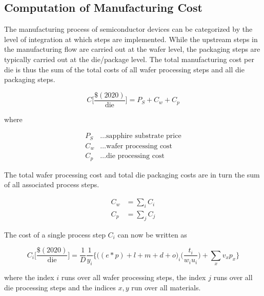 \documentclass[10pt]{article}
\begin{document}
\subsection{Computation of Manufacturing Cost}

The manufacturing process of semiconductor devices can be categorized by the level of integration at which steps are implemented. While the upstream steps in the manufacturing flow are carried out at the wafer level, the packaging steps are typically carried out at the die/package level. The total manufacturing cost per die is thus the sum of the total costs of all wafer processing steps and all die packaging steps.

\begin{equation}
\label{eqn:cost_sum}
    C \bigg[ \frac{ \$(2020) }{ \text{die} } \bigg] = P_S + C_w + C_p
\end{equation}

where

\begin{align*}
    P_S &\dots \text{sapphire substrate price} \\
    C_w &\dots \text{wafer processing cost} \\
    C_p &\dots \text{die processing cost}
\end{align*}

The total wafer processing cost and total die packaging costs are in turn the sum of all associated process steps.

\begin{align}
	C_w &= \sum_i C_i \\
	C_p &= \sum_j C_j
\end{align}

The cost of a single process step $C_i$ can now be written as

\begin{equation}
\label{eqn:cost_wafer}
    C_i \bigg[ \frac{ \$(2020) }{ \text{die} } \bigg] =\frac{1}{D}  \frac{1}{y_i}   \bigg\{ \bigg((e*p) + l + m + d +o \bigg)_i \bigg( \frac{t_i}{w_i u_i} \bigg) + \sum_{x} v_x p_x \bigg\}
\end{equation}

where the index $i$ runs over all wafer processing steps, the index $j$ runs over all die processing steps and the indices $x,y$ run over all materials.
\end{document}
